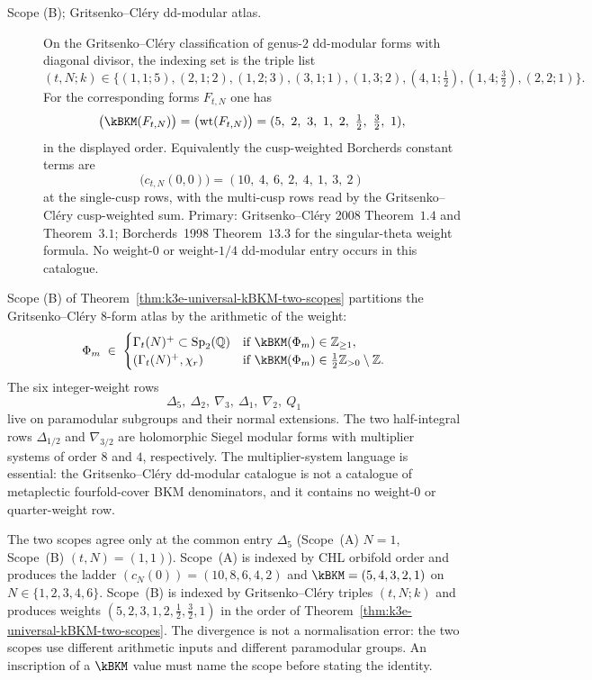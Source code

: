 \begin{theorem}
\begin{description}
\item[Scope (B); Gritsenko--Cl\'ery dd-modular atlas.]
On the Gritsenko--Cl\'ery classification of genus-$2$ dd-modular forms
with diagonal divisor, the indexing set is the triple list
\[
 (t,N;k)\in\{(1,1;5),(2,1;2),(1,2;3),(3,1;1),(1,3;2),
 (4,1;\tfrac12),(1,4;\tfrac32),(2,2;1)\}.
\]
For the corresponding forms $F_{t,N}$ one has
\[
 \bigl(\kBKM(F_{t,N})\bigr)
 =
 \bigl(\mathrm{wt}(F_{t,N})\bigr)
 =
 (5,\ 2,\ 3,\ 1,\ 2,\ \tfrac12,\ \tfrac32,\ 1),
\]
in the displayed order. Equivalently the cusp-weighted Borcherds
constant terms are
\[
 \bigl(c_{t,N}(0,0)\bigr)=(10,\ 4,\ 6,\ 2,\ 4,\ 1,\ 3,\ 2)
\]
at the single-cusp rows, with the multi-cusp rows read by the
Gritsenko--Cl\'ery cusp-weighted sum. Primary: Gritsenko--Cl\'ery
2008 Theorem~$1.4$ and Theorem~$3.1$; Borcherds~1998
Theorem~$13.3$ for the singular-theta weight formula. No
weight-$0$ or weight-$1/4$ dd-modular entry occurs in this catalogue.
\end{description}
\end{theorem}

\begin{remark}
\label{rem:k3e-cover-stratification-by-weight}
Scope (B) of Theorem~\ref{thm:k3e-universal-kBKM-two-scopes} partitions the Gritsenko--Cl\'ery 8-form atlas by the arithmetic of the weight:
\[
 \Phi_m \;\in\; \begin{cases}
 \Gamma_t(N)^+ \subset \mathrm{Sp}_2(\mathbb Q) & \text{if } \kBKM(\Phi_m) \in \mathbb{Z}_{\geq 1}, \\
 (\Gamma_t(N)^+, \chi_r) & \text{if } \kBKM(\Phi_m) \in \tfrac{1}{2}\mathbb{Z}_{>0}\setminus\mathbb Z .
 \end{cases}
\]
The six integer-weight rows
\[
\Delta_5,\ \Delta_2,\ \nabla_3,\ \Delta_1,\ \nabla_2,\ Q_1
\]
live on paramodular subgroups and their normal extensions. The two
half-integral rows $\Delta_{1/2}$ and $\nabla_{3/2}$ are holomorphic
Siegel modular forms with multiplier systems of order $8$ and $4$,
respectively. The multiplier-system language is essential: the
Gritsenko--Cl\'ery dd-modular catalogue is not a catalogue of
metaplectic fourfold-cover BKM denominators, and it contains no
weight-$0$ or quarter-weight row.
\end{remark}

\begin{remark}[Scope (A) versus Scope (B): coincidence at $N = 1$, divergence elsewhere]
\label{rem:k3e-two-scopes-coincidence-divergence}
The two scopes agree only at the common entry $\Delta_5$ (Scope~(A)
$N=1$, Scope~(B) $(t,N)=(1,1)$). Scope~(A) is indexed by CHL
orbifold order and produces the ladder
$(c_N(0))=(10,8,6,4,2)$ and
$\kBKM=(5,4,3,2,1)$ on $N\in\{1,2,3,4,6\}$.
Scope~(B) is indexed by Gritsenko--Cl\'ery triples $(t,N;k)$ and
produces weights $(5,2,3,1,2,\tfrac12,\tfrac32,1)$ in the order of
Theorem~\ref{thm:k3e-universal-kBKM-two-scopes}. The divergence is
not a normalisation error: the two scopes use different arithmetic
inputs and different paramodular groups. An inscription of a
$\kBKM$ value must name the scope before stating the identity.
\end{remark}

